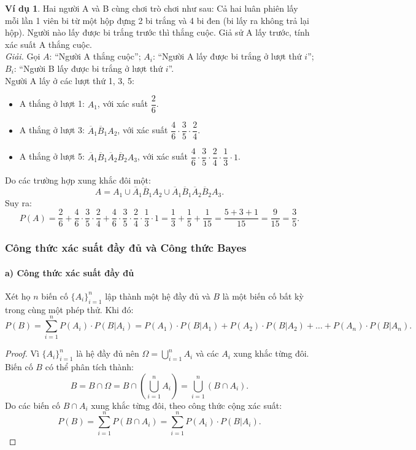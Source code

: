 \documentclass[12pt,a4paper]{article}
\theoremstyle{definition}
\newtheorem{vidu}{Ví dụ}[section]
\begin{document}
\begin{vidu}
Hai người A và B cùng chơi trò chơi như sau: Cả hai luân phiên lấy mỗi lần 1 viên bi từ một hộp đựng 2 bi trắng và 4 bi đen (bi lấy ra không trả lại hộp). Người nào lấy được bi trắng trước thì thắng cuộc. Giả sử A lấy trước, tính xác suất A thắng cuộc.\\
\textit{Giải.} 
Gọi $A$: ``Người A thắng cuộc'';
$A_i$: ``Người A lấy được bi trắng ở lượt thứ $i$'';
$B_i$: ``Người B lấy được bi trắng ở lượt thứ $i$''.\\
Người A lấy ở các lượt thứ 1, 3, 5:
\begin{itemize}
    \item A thắng ở lượt 1: $A_1$, với xác suất $\dfrac{2}{6}$.
    \item A thắng ở lượt 3: $\overline{A}_1 \overline{B}_1 A_2$, với xác suất $\dfrac{4}{6} \cdot \dfrac{3}{5} \cdot \dfrac{2}{4}$.
    \item A thắng ở lượt 5: $\overline{A}_1 \overline{B}_1 \overline{A}_2 \overline{B}_2 A_3$, với xác suất $\dfrac{4}{6} \cdot \dfrac{3}{5} \cdot \dfrac{2}{4} \cdot \dfrac{1}{3} \cdot 1$.
\end{itemize}
Do các trường hợp xung khắc đôi một:
\[
A = A_1 \cup \overline{A}_1 \overline{B}_1 A_2 \cup \overline{A}_1 \overline{B}_1 \overline{A}_2 \overline{B}_2 A_3.
\]
Suy ra:
\[
P(A) = \frac{2}{6} + \frac{4}{6} \cdot \frac{3}{5} \cdot \frac{2}{4} + \frac{4}{6} \cdot \frac{3}{5} \cdot \frac{2}{4} \cdot \frac{1}{3} \cdot 1 = \frac{1}{3} + \frac{1}{5} + \frac{1}{15} = \frac{5 + 3 + 1}{15} = \frac{9}{15} = \frac{3}{5}.
\]
\end{vidu}

\subsubsection{Công thức xác suất đầy đủ và Công thức Bayes}

\paragraph{a) Công thức xác suất đầy đủ}
Xét họ $n$ biến cố $\{A_i\}_{i=1}^n$ lập thành một hệ đầy đủ và $B$ là một biến cố bất kỳ trong cùng một phép thử. Khi đó:
\[
P(B) = \sum_{i=1}^n P(A_i) \cdot P(B|A_i) = P(A_1) \cdot P(B|A_1) + P(A_2) \cdot P(B|A_2) + \dots + P(A_n) \cdot P(B|A_n).
\]

\begin{proof}
Vì $\{A_i\}_{i=1}^n$ là hệ đầy đủ nên $\Omega = \bigcup_{i=1}^n A_i$ và các $A_i$ xung khắc từng đôi.\\
Biến cố $B$ có thể phân tích thành:
\[
B = B \cap \Omega = B \cap \left(\bigcup_{i=1}^n A_i\right) = \bigcup_{i=1}^n (B \cap A_i).
\]
Do các biến cố $B \cap A_i$ xung khắc từng đôi, theo công thức cộng xác suất:
\[
P(B) = \sum_{i=1}^n P(B \cap A_i) = \sum_{i=1}^n P(A_i) \cdot P(B|A_i).
\]
\end{proof}
\end{document}
